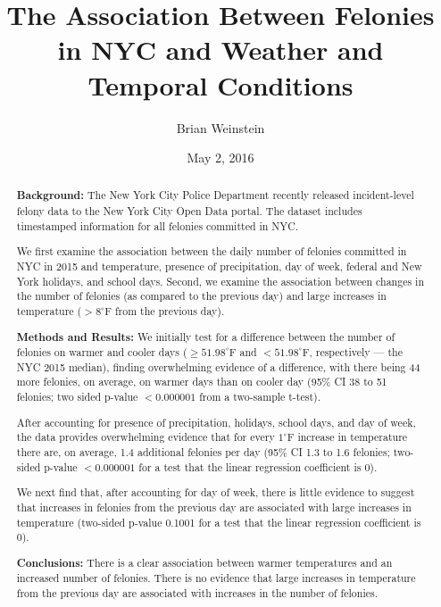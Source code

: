 \documentclass[11pt,notitlepage]{article}
\newcommand{\degf}{^\circ\text{F}}
\begin{document}
\title{The Association Between Felonies in NYC and Weather and Temporal Conditions}
\author{Brian Weinstein}
\date{May 2, 2016}

\maketitle



\begin{abstract}
\singlespacing


\noindent \textbf{Background:} The New York City Police Department recently released incident-level felony data to the New York City Open Data portal. The dataset includes timestamped information for all felonies committed in NYC.

We first examine the association between the daily number of felonies committed in NYC in 2015 and temperature, presence of precipitation, day of week, federal and New York holidays, and school days. Second, we examine the association between changes in the number of felonies (as compared to the previous day) and large increases in temperature ($>8 \degf$ from the previous day).

\noindent \textbf{Methods and Results:} We initially test for a difference between the number of felonies on warmer and cooler days ($\geq 51.98 \degf$ and $< 51.98 \degf$, respectively --- the NYC 2015 median), finding overwhelming evidence of a difference, with there being 44 more felonies, on average, on warmer days than on cooler day (95\% CI 38 to 51 felonies; two sided p-value $<0.000001$ from a two-sample t-test). 

After accounting for presence of precipitation, holidays, school days, and day of week, the data provides overwhelming evidence that for every $1 \degf$ increase in temperature there are, on average, 1.4 additional felonies per day (95\% CI 1.3 to 1.6 felonies; two-sided p-value $<0.000001$ for a test that the linear regression coefficient is 0). 

We next find that, after accounting for day of week, there is little evidence to suggest that increases in felonies from the previous day are associated with large increases in temperature (two-sided p-value 0.1001 for a test that the linear regression coefficient is 0).

\noindent \textbf{Conclusions:} There is a clear association between warmer temperatures and an increased number of felonies. There is no evidence that large increases in temperature from the previous day are associated with increases in the number of felonies.




\end{abstract}
\end{document}
